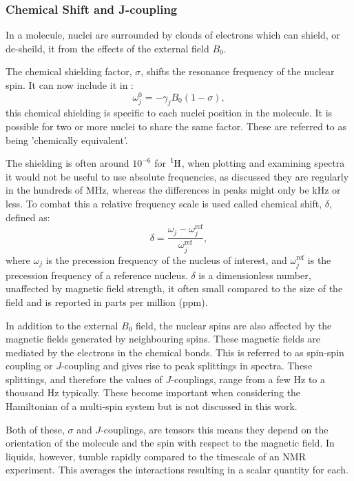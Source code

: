 \subsubsection{Chemical Shift and J-coupling}

In a molecule, nuclei are surrounded by clouds of electrons which can shield, or de-sheild, it
from the effects of the external field $B_0$.

The chemical shielding factor, $\sigma$, shifts the resonance frequency of the nuclear spin. It
can now include it in :
\begin{equation}
  \omega_j^0 = -\gamma_jB_0(1-\sigma),
\end{equation}
this chemical shielding is specific to each nuclei position in the molecule. It is possible
for two or more nuclei to share the same factor. These are referred to as being 'chemically equivalent'.

The shielding is often around $10^{-6}$ for $\ce{^1H}$, when plotting and examining spectra
it would not be useful to use absolute frequencies, as discussed they are regularly in the hundreds of MHz,
whereas the differences in peaks might only be kHz or less. To combat this a relative frequency scale is used
called chemical shift, $\delta$, defined as:
\begin{equation}
  \delta = \frac{\omega_j-\omega^\text{ref}_j}{\omega^\text{ref}_j},
\end{equation}
where $\omega_j$ is the precession frequency of the nucleus of interest, and $\omega^\text{ref}_j$ is the precession
frequency of a reference nucleus. $\delta$ is a dimensionless number, unaffected by magnetic field strength, it often
small compared to the size of the field and is reported in parts per million (ppm).

In addition to the external $B_0$ field, the nuclear spins are also affected by the magnetic fields generated
by neighbouring spins. These magnetic fields are mediated by the electrons in the chemical bonds. This is referred to as
spin-spin coupling or $J$-coupling and gives rise to peak splittings in spectra. These splittings, and therefore the values
of $J$-couplings, range from a few Hz to a thousand Hz typically. These become important when considering the
Hamiltonian of a multi-spin system but is not discussed in this work.

Both of these, $\sigma$ and $J$-couplings, are tensors this means they depend on the orientation of the molecule
and the spin with respect to the magnetic field. In liquids, however, tumble rapidly compared to the timescale
of an NMR experiment. This averages the interactions resulting in a scalar quantity for each.

